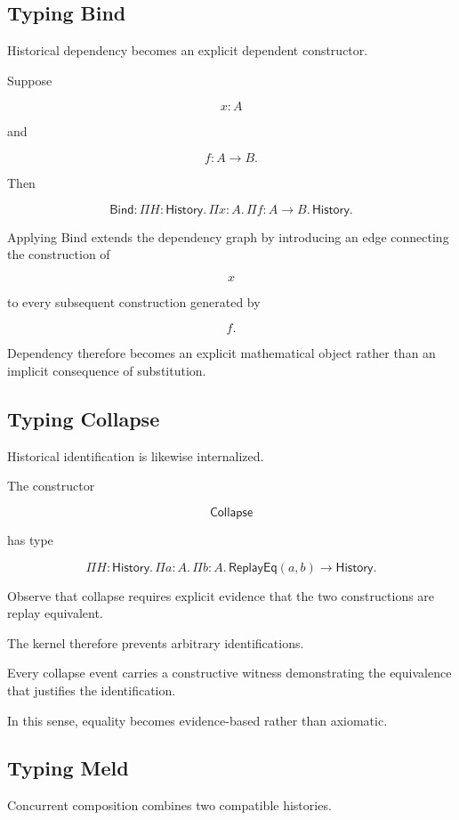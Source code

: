 \documentclass[12pt,oneside]{article}
\theoremstyle{definition}
\theoremstyle{remark}
\newcommand{\Bind}{\mathsf{Bind}}
\newcommand{\Collapse}{\mathsf{Collapse}}
\begin{document}
\subsection{Typing Bind}

Historical dependency becomes an explicit dependent constructor.

Suppose

\[
x:A
\]

and

\[
f
:
A
\rightarrow
B.
\]

Then

\[
\Bind
:
\Pi
H:\mathsf{History}.
\,
\Pi
x:A.
\,
\Pi
f:A\rightarrow B.
\,
\mathsf{History}.
\]

Applying Bind extends the dependency graph by introducing an edge connecting
the construction of

\[
x
\]

to every subsequent construction generated by

\[
f.
\]

Dependency therefore becomes an explicit mathematical object rather than an
implicit consequence of substitution.

\subsection{Typing Collapse}

Historical identification is likewise internalized.

The constructor

\[
\Collapse
\]

has type

\[
\Pi
H:\mathsf{History}.
\,
\Pi
a:A.
\,
\Pi
b:A.
\,
\mathsf{ReplayEq}(a,b)
\rightarrow
\mathsf{History}.
\]

Observe that collapse requires explicit evidence that the two constructions are
replay equivalent.

The kernel therefore prevents arbitrary identifications.

Every collapse event carries a constructive witness demonstrating the
equivalence that justifies the identification.

In this sense, equality becomes evidence-based rather than axiomatic.

\subsection{Typing Meld}

Concurrent composition combines two compatible histories.
\end{document}
